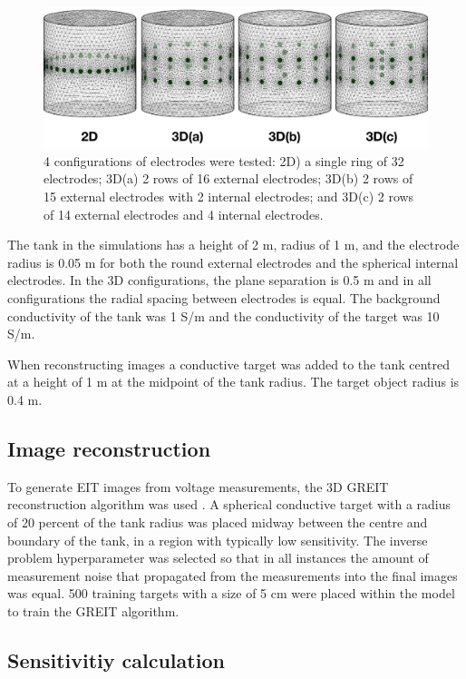 \begin{figure}
\centering
\includegraphics[width=\textwidth]{chapter6-internal_electrodes/imgs/FEM_Comparison.pdf}
\caption[Internal electrode configurations]{4 configurations of electrodes were tested: 2D) a single ring of 32 electrodes; 
	3D(a) 2 rows of 16 external electrodes; 3D(b) 2 rows of 15 external electrodes with 2 internal electrodes; and 3D(c) 2 rows 
of 14 external electrodes and 4 internal electrodes.}
\label{fig:tank_FEM}
\end{figure}

The tank in the simulations has a height of 2 m, radius of 1 m, and the electrode radius
is 0.05 m for both the round external electrodes and the spherical internal electrodes.
In the 3D configurations, the plane separation is 0.5 m and in all configurations the radial
spacing between electrodes is equal.
The background conductivity of the tank was 1 S/m and the conductivity of the target was
10 S/m.

When reconstructing images a conductive target was added to the tank
centred at a height of 1 m at the midpoint of the tank radius. The target
object radius is 0.4 m.

\subsection{Image reconstruction}

To generate EIT images from voltage measurements, the 3D GREIT
reconstruction algorithm
was used \parencite{grychtol_3d_2016}. A spherical
conductive target with a radius of 20 percent of the tank radius
was placed midway between the centre and boundary
of the tank, in a region with typically low sensitivity.
The inverse problem hyperparameter
was selected so that in all instances the amount of measurement
noise that propagated from the measurements into the final images
was equal. 500 training targets with a size of 5 cm were placed within the model to train the GREIT 
algorithm. 

\subsection{Sensitivitiy calculation}

